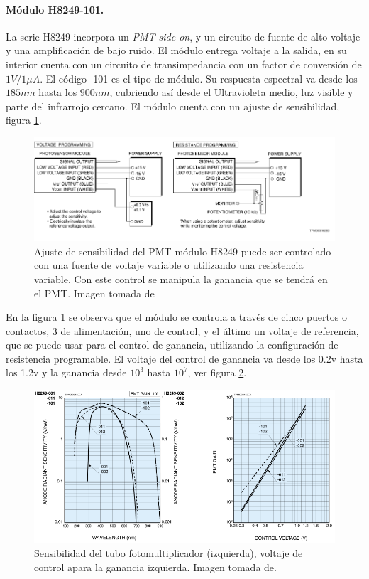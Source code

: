 \paragraph{Módulo H8249-101.}
La serie H8249 incorpora un \textit{PMT-side-on}, y un circuito de fuente de alto voltaje y una amplificación de bajo ruido. El módulo entrega voltaje a la salida, en su interior cuenta con un circuito de transimpedancia con un factor de conversión de $1V/1\mu A$. El código -101 es el tipo de módulo. Su respuesta espectral va desde los $185nm$ hasta los $900nm$, cubriendo así desde el Ultravioleta medio, luz visible y parte del infrarrojo cercano.
El módulo cuenta con un ajuste de sensibilidad, figura \ref{fig:sensibilidadajuste}.

\begin{figure}[h]
	\centering
	\includegraphics[width=0.8\linewidth]{Imagenes/2/SensibilidadAjuste}
	\caption[Ajuste de sensibilidad del PMT módulo H8249]{Ajuste de sensibilidad del PMT módulo H8249 puede ser controlado con una fuente de voltaje variable o utilizando una resistencia variable. Con este control se manipula la ganancia que se tendrá en el PMT. Imagen tomada de \cite{Hamamatsu2008}}
	\label{fig:sensibilidadajuste}
\end{figure}

 En la figura \ref{fig:sensibilidadajuste} se observa que el módulo se controla a través de cinco puertos o contactos, 3 de alimentación, uno de control, y el último un voltaje de referencia, que se puede usar para el control de ganancia, utilizando la configuración de resistencia programable. El voltaje del control de ganancia va desde los 0.2v hasta los 1.2v y la ganancia desde $10^{3}$ hasta $10^{7}$, ver figura \ref{fig:pmtgain}.
 \begin{figure}
 	\centering
 	\includegraphics[width=0.7\linewidth]{Imagenes/2/PMT_GAIN}
 	\caption[Sensibilidad y ganancia H8249]{Sensibilidad del tubo fotomultiplicador (izquierda), voltaje de control apara la ganancia izquierda. Imagen tomada de. \cite{Hamamatsu2008}}
 	\label{fig:pmtgain}
 \end{figure}

